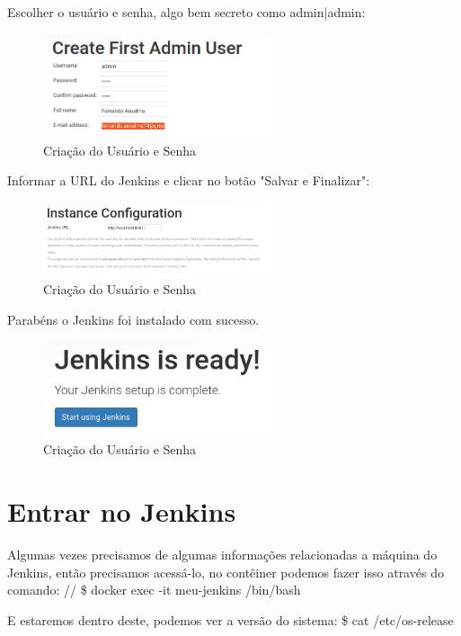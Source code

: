 \documentclass[a4paper,11pt]{article}
\begin{document}
Escolher o usuário e senha, algo bem secreto como admin|admin:
\begin{figure}[H]
	\centering
	\includegraphics[width=0.6\textwidth]{imagens/i3CriarSenha.png}
	\caption{Criação do Usuário e Senha}
\end{figure}

Informar a URL do Jenkins e clicar no botão "Salvar e Finalizar":
\begin{figure}[H]
	\centering
	\includegraphics[width=0.6\textwidth]{imagens/i4ConfirmaUrl.png}
	\caption{Criação do Usuário e Senha}
\end{figure}

Parabéns o Jenkins foi instalado com sucesso.
\begin{figure}[H]
	\centering
	\includegraphics[width=0.6\textwidth]{imagens/i5Parabens.png}
	\caption{Criação do Usuário e Senha}
\end{figure}

\section{Entrar no Jenkins}
Algumas vezes precisamos de algumas informações relacionadas a máquina do Jenkins, então precisamos acessá-lo, no contêiner podemos fazer isso através do comando: //
{\ttfamily\$ docker exec -it meu-jenkins /bin/bash}

E estaremos dentro deste, podemos ver a versão do sistema:
{\ttfamily\$ cat /etc/os-release}
\end{document}
